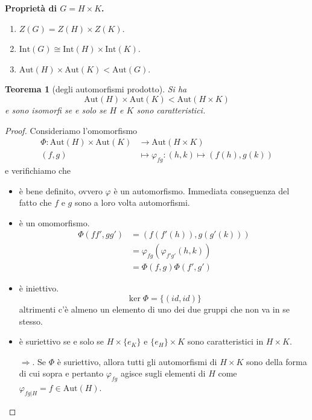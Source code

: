 \documentclass[a4paper]{article}
\newtheorem{theorem}{Teorema}[section]
\theoremstyle{remark}
\theoremstyle{definition}
\newcommand{\Aut}[1]{\mathrm{Aut}\left( #1 \right)}
\newcommand{\Int}[1]{\mathrm{Int}\left( #1 \right)}
\newcommand{\fun}[5]{\begin{align*}
	#1 \colon #2 &\to #3 \\
	#4 &\mapsto #5
	\end{align*}}
\begin{document}
\begin{multicols}{2}
\textbf{Proprietà di $ G = H \times K $.}
\begin{enumerate}
	\item $ Z(G) = Z(H) \times Z(K) $.
	\item $ \Int{G} \cong \Int{H} \times \Int{K} $.
	\item $ \Aut{H} \times \Aut{K} < \Aut{G} $.
\end{enumerate}
\begin{theorem}[degli automorfismi prodotto]
	Si ha $$  \Aut{H} \times \Aut{K} < \Aut{H \times K}  $$ e sono isomorfi se e solo se $ H $ e $ K $ sono caratteristici.
\end{theorem}
\begin{proof}
	Consideriamo l'omomorfismo \fun{\Phi}{\Aut{H} \times \Aut{K}}{\Aut{H \times K}}{(f, g)}{\varphi_{fg}: (h, k) \mapsto \left(f(h), g(k)\right)}
	e verifichiamo che
	\begin{itemize}
		\item è bene definito, ovvero $ \varphi $ è un automorfismo. Immediata conseguenza del fatto che $ f $ e $ g $ sono a loro volta automorfismi.
		\item è un omomorfismo.  \begin{align*}
			\Phi(ff',gg') &= \left( f(f'(h)), g(g'(k)) \right)\\& = \varphi_{fg}(\varphi_{f'g'}(h, k)) \\&= \Phi(f, g)\Phi(f',g') 
		\end{align*}
		\item è iniettivo.
		\[ \ker\Phi = \{ (id, id) \} \]
		altrimenti c'è almeno un elemento di uno dei due gruppi che non va in se stesso.
		
		\item è suriettivo se e solo se $ H\times\{e_K\} $ e $ \{e_H\}\times K $ sono caratteristici in $ H \times K $.
		
		$ \Rightarrow $. Se $ \Phi $ è suriettivo, allora tutti gli automorfismi di $ H \times K $ sono della forma di cui sopra e pertanto $ \varphi_{fg} $ agisce sugli elementi di $ H $ come $ \varphi_{fg|H} = f \in \Aut{H} $.
		

\end{itemize}
\end{proof}
\end{multicols}
\end{document}
